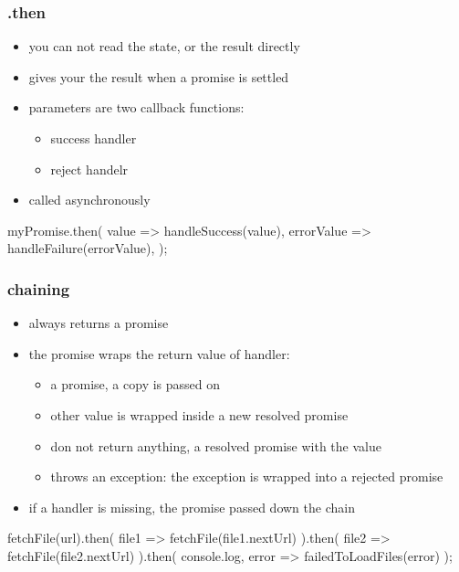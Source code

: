 \begin{frame}[fragile] \frametitle{.then}
\begin{itemize}
  \item you can not read the state, or the result directly
  \item {} gives your the result when a promise is settled
  \item parameters are two callback functions:
  \begin{itemize}
    \item success handler
    \item reject handelr
  \end{itemize}
  \item called asynchronously
\end{itemize}
\vspace{5mm}
\begin{CodeBox}{}
myPromise.then(
  value => handleSuccess(value),
  errorValue => handleFailure(errorValue),
);
\end{CodeBox}
\end{frame}

\begin{frame}[fragile] \frametitle{chaining}
\begin{itemize}
  \item {} always returns a promise
  \item the promise wraps the return value of  handler:
  \begin{itemize}
    \item a promise, a copy is passed on
    \item other value is wrapped inside a new resolved promise
    \item don not return anything, a resolved promise with the value 
    \item throws an exception: the exception is wrapped into a rejected promise
  \end{itemize}
  \item if a handler is missing, the promise passed down the chain
\end{itemize}
\vspace{1mm}
\begin{CodeBox}{}
fetchFile(url).then(
  file1 => fetchFile(file1.nextUrl)
).then(
  file2 => fetchFile(file2.nextUrl)
).then(
  console.log,
  error => failedToLoadFiles(error)
);
\end{CodeBox}
\end{frame}

